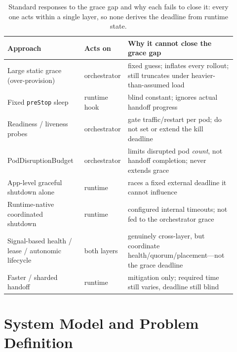\documentclass[AMA,Times1COL]{WileyNJDv5}
\begin{document}
\begin{table}[t]
\centering
\caption{Standard responses to the grace gap and why each fails to close it: every one acts within a
single layer, so none derives the deadline from runtime state.}\label{tab:existing}
\begin{tabular}{@{}p{0.30\linewidth}p{0.15\linewidth}p{0.47\linewidth}@{}}
\toprule
\textbf{Approach} & \textbf{Acts on} & \textbf{Why it cannot close the grace gap} \\
\midrule
Large static grace (over-provision)~\cite{k8sgraceful} & orchestrator & fixed guess; inflates every rollout; still truncates under heavier-than-assumed load \\
Fixed \texttt{preStop} sleep~\cite{k8sgraceful} & runtime hook & blind constant; ignores actual handoff progress \\
Readiness / liveness probes~\cite{k8sgraceful} & orchestrator & gate traffic/restart per pod; do not set or extend the kill deadline \\
PodDisruptionBudget~\cite{k8sPDB} & orchestrator & limits disrupted pod \emph{count}, not handoff completion; never extends grace \\
App-level graceful shutdown alone & runtime & races a fixed external deadline it cannot influence \\
Runtime-native coordinated shutdown~\cite{akkacoordinated,orleans} & runtime & configured internal timeouts; not fed to the orchestrator grace \\
Signal-based health / lease / autonomic lifecycle~\cite{roberts2025,akkaLease,kephart2003} & both layers & genuinely cross-layer, but coordinate health/quorum/placement---not the grace deadline \\
Faster / sharded handoff~\cite{elnozahy2002} & runtime & mitigation only; required time still varies, deadline still blind \\
\bottomrule
\end{tabular}
\end{table}

\section{System Model and Problem Definition}\label{sec:model}
\end{document}
